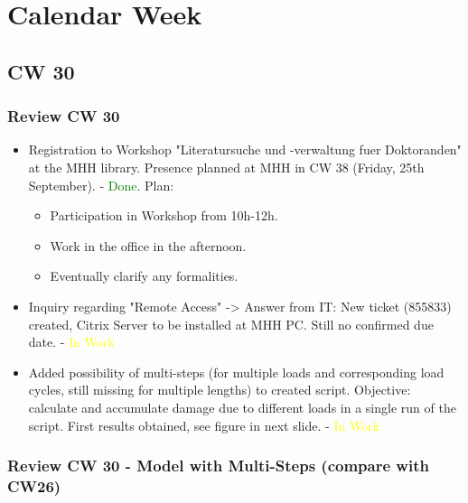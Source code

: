 \section{Calendar Week}
\subsection{CW 30}
\begin{frame}
  \frametitle{Review CW 30}
	\begin{itemize}
		\item Registration to Workshop "Literatursuche und -verwaltung fuer Doktoranden" at the MHH library. Presence planned at MHH in CW 38 (Friday, 25th September). - \textcolor{green}{Done}. Plan: 
		\begin{itemize}
			\item Participation in Workshop from 10h-12h.
			\item Work in the office in the afternoon.
			\item Eventually clarify any formalities.
		\end{itemize}			
		\item Inquiry regarding "Remote Access" -> Answer from IT: New ticket (855833) created, Citrix Server to be installed at MHH PC. Still no confirmed due date.  - \textcolor{yellow}{In Work} 
		\item Added possibility of multi-steps (for multiple loads and corresponding load cycles, still missing for multiple lengths) to created script. Objective: calculate and accumulate damage due to different loads in a single run of the script. First results obtained, see figure in next slide. - \textcolor{yellow}{In Work} 
	\end{itemize}
\end{frame}

\begin{frame}
  \frametitle{Review CW 30 - Model with Multi-Steps (compare with CW26)}
	\begin{figure}
	\end{figure}
\end{frame}

